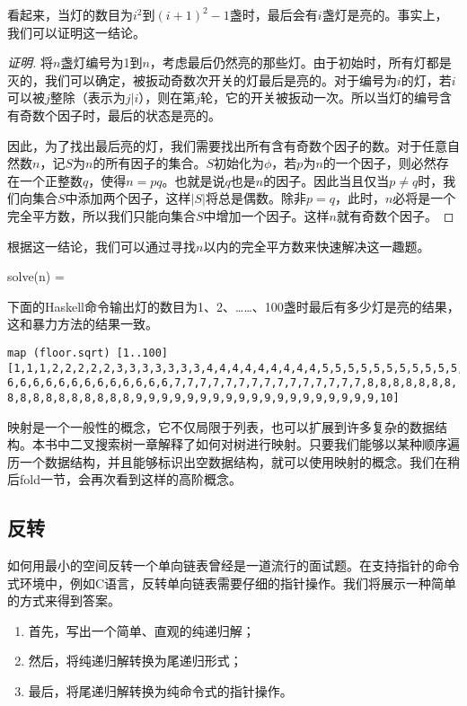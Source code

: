 \documentclass[b5paper]{ctexart}
\begin{document}
看起来，当灯的数目为$i^2$到$(i+1)^2-1$盏时，最后会有$i$盏灯是亮的。事实上，我们可以证明这一结论。

\begin{proof}[证明]
将$n$盏灯编号为1到$n$，考虑最后仍然亮的那些灯。由于初始时，所有灯都是灭的，我们可以确定，被扳动奇数次开关的灯最后是亮的。对于编号为$i$的灯，若$i$可以被$j$整除（表示为$j | i$），则在第$j$轮，它的开关被扳动一次。所以当灯的编号含有奇数个因子时，最后的状态是亮的。

因此，为了找出最后亮的灯，我们需要找出所有含有奇数个因子的数。对于任意自然数$n$，记$S$为$n$的所有因子的集合。$S$初始化为$\phi$，若$p$为$n$的一个因子，则必然存在一个正整数$q$，使得$n = p q$。也就是说$q$也是$n$的因子。因此当且仅当$p \neq q$时，我们向集合$S$中添加两个因子，这样$|S|$将总是偶数。除非$p = q$，此时，$n$必将是一个完全平方数，所以我们只能向集合$S$中增加一个因子。这样$n$就有奇数个因子。
\end{proof}

根据这一结论，我们可以通过寻找$n$以内的完全平方数来快速解决这一趣题。

\be
solve(n) = \lfloor {} \rfloor
\ee

下面的Haskell命令输出灯的数目为1、2、……、100盏时最后有多少灯是亮的结果，这和暴力方法的结果一致。

\begin{lstlisting}[style=Haskell]
map (floor.sqrt) [1..100]
[1,1,1,2,2,2,2,2,3,3,3,3,3,3,3,4,4,4,4,4,4,4,4,4,5,5,5,5,5,5,5,5,5,5,5,
6,6,6,6,6,6,6,6,6,6,6,6,6,7,7,7,7,7,7,7,7,7,7,7,7,7,7,7,8,8,8,8,8,8,8,
8,8,8,8,8,8,8,8,8,8,9,9,9,9,9,9,9,9,9,9,9,9,9,9,9,9,9,9,9,10]
\end{lstlisting}

映射是一个一般性的概念，它不仅局限于列表，也可以扩展到许多复杂的数据结构。本书中二叉搜索树一章解释了如何对树进行映射。只要我们能够以某种顺序遍历一个数据结构，并且能够标识出空数据结构，就可以使用映射的概念。我们在稍后fold一节，会再次看到这样的高阶概念。

\subsection{反转}

如何用最小的空间反转一个单向链表曾经是一道流行的面试题。在支持指针的命令式环境中，例如C语言，反转单向链表需要仔细的指针操作。我们将展示一种简单的方式来得到答案。

\begin{enumerate}
\item 首先，写出一个简单、直观的纯递归解；
\item 然后，将纯递归解转换为尾递归形式；
\item 最后，将尾递归解转换为纯命令式的指针操作。
\end{enumerate}
\end{document}

